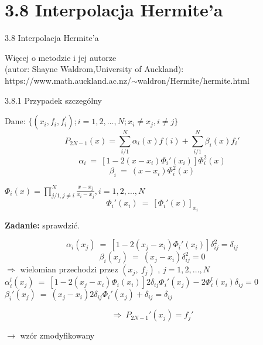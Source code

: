 \section{3.8 Interpolacja Hermite'a}
\begin{frame}
{3.8 Interpolacja Hermite'a}

Więcej o metodzie i jej autorze \\
(autor: Shayne Waldrom,University of Auckland):\\
\vspace{5mm}
https://www.math.auckland.ac.nz/$\sim$waldron/Hermite/hermite.html
\end{frame}

\begin{frame}
{3.8.1 Przypadek szczególny}

Dane: $\{(x_{i}, f_{i}, f_{i}^{'}); i=1,2, \dots, N; x_{i}\neq x_{j}, i\neq j\}$
$$
P_{2N-1}(x)=\sum_{i/1}^{N}\alpha_{i}(x)f(i)+\sum_{i/1}^{N}\beta_{i}(x)f_{i}'
$$
$$
\alpha_{i}\ =\ [1-2(x-x_{i})\Phi_{i}'(x_{i})]\Phi_{i}^{2}(x)
$$
$$
\beta_{i}\ =\ (x-x_{i})\Phi_{i}^{2}(x)
$$
\begin{center}
$\Phi_{i}(x) = \displaystyle \prod_{j/1,j\neq i}^{N}\frac{x-x_{j}}{x_{i}-x_{j}}, i=1, 2,\dots, N$
$$
\Phi_{i}'(x_{i})\ =\ [\Phi_{i}'(x)]_{x_{i}}
$$
\end{center}
\textbf{Zadanie:} sprawdzić.


\end{frame}

\begin{frame}
$$
\alpha_{i}(x_{j})\ =\ [1-2(x_{j}-x_{i})\Phi_{i}'(x_{i})]\delta_{ij}^{2}=\delta_{ij}
$$
$$
\beta_{i}(x_{j})\ =\ (x_{j}-x_{i})\delta_{ij}^{2}=0
$$
$\Rightarrow$ wielomian przechodzi przez $(x_{j},\ f_{j})$ , $j=1,2, \dots, N$ \\
\vspace{3mm}
$\alpha_{i}^{l}(x_{j})\ =\ [1-2(x_{j}-x_{i})\Phi_{i}(x_{i})]2\delta_{ij}\Phi_{i}'(x_{j})-2\Phi_{i}^{l}(x_{i})\delta_{ij}=0$ \\
\vspace{3mm}
$\beta_{i}'(x_{j})\ =\ (x_{j}-x_{i})2\delta_{ij}\Phi_{i}'(x_{j})+\delta_{ij}=\delta_{ij}$

$$
\Rightarrow\ P_{2N-1}'(x_{j})=f_{j}'
$$
\begin{flushright}$\rightarrow$ wzór zmodyfikowany \end{flushright}
\end{frame}

